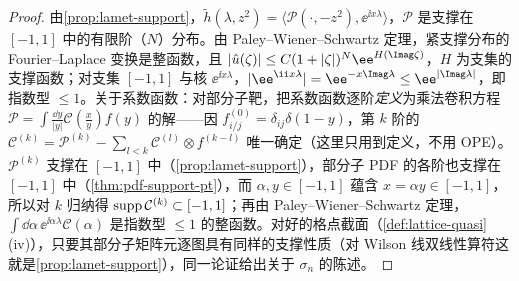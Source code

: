 \begin{proof}
由\cref{prop:lamet-support}，$\tilde h(\lambda,z^2)=\langle\mathcal P(\cdot,-z^2),\ee^{\ii x\lambda}\rangle$，$\mathcal P$ 是支撑在 $[-1,1]$ 中的有限阶（$N$）分布。由 Paley--Wiener--Schwartz 定理\cite[定理~7.3.1]{Hormander2003}，紧支撑分布的 Fourier--Laplace 变换是整函数，且 $|\hat u(\zeta)|\le C(1+|\zeta|)^N\ee^{H(\Imag\zeta)}$，$H$ 为支集的支撑函数；对支集 $[-1,1]$ 与核 $\ee^{\ii x\lambda}$，$|\ee^{\ii x\lambda}|=\ee^{-x\Imag\lambda}\le\ee^{|\Imag\lambda|}$，即指数型 $\le1$。关于系数函数：对部分子靶，把系数函数逐阶\emph{定义}为乘法卷积方程 $\mathcal P=\int\frac{\dd y}{|y|}\mathcal C(\frac xy)f(y)$ 的解——因 $f^{(0)}_{i/j}=\delta_{ij}\delta(1-y)$，第 $k$ 阶的 $\mathcal C^{(k)}=\mathcal P^{(k)}-\sum_{l<k}\mathcal C^{(l)}\otimes f^{(k-l)}$ 唯一确定（这里只用到定义，不用 OPE）。$\mathcal P^{(k)}$ 支撑在 $[-1,1]$ 中（\cref{prop:lamet-support}），部分子 PDF 的各阶也支撑在 $[-1,1]$ 中（\cref{thm:pdf-support-pt}），而 $\alpha,y\in[-1,1]$ 蕴含 $x=\alpha y\in[-1,1]$，所以对 $k$ 归纳得 ${\rm supp}\,\mathcal C^{(k)}\subset[-1,1]$；再由 Paley--Wiener--Schwartz 定理，$\int\dd\alpha\,\ee^{\ii\alpha\lambda}\mathcal C(\alpha)$ 是指数型 $\le1$ 的整函数。对好的格点截面（\cref{def:lattice-quasi}(iv)），只要其部分子矩阵元逐图具有同样的支撑性质（对 Wilson 线双线性算符这就是\cref{prop:lamet-support}），同一论证给出关于 $\sigma_n$ 的陈述。
\end{proof}


